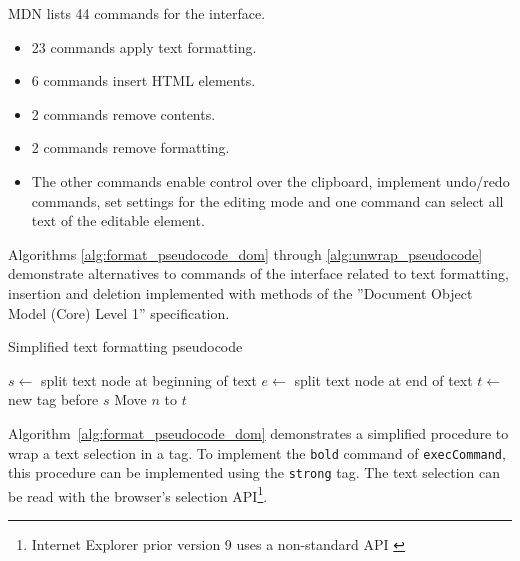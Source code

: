 MDN lists 44 commands for the  interface\cite{bc}. %

\begin{itemize}
\item 23 commands apply text formatting.
\item 6 commands insert HTML elements.
\item 2 commands remove contents.
\item 2 commands remove formatting.
\item The other commands enable control over the clipboard, implement undo/redo commands, set settings for the editing mode and one command can select all text of the editable element.
\end{itemize}

Algorithms \ref{alg:format_pseudocode_dom} through \ref{alg:unwrap_pseudocode} demonstrate alternatives to commands of the  interface related to text formatting, insertion and deletion implemented with methods of the ''Document Object Model (Core) Level 1'' specification.


\begin{algorithm}
\caption{Simplified text formatting pseudocode}
\label{alg:format_pseudocode_dom}
\begin{algorithmic}[1]
\State $s \gets$ split text node at beginning of text
\State $e \gets$ split text node at end of text
\State $t \gets$ new tag before $s$
  \State Move $n$ to $t$
\EndFor
\EndProcedure
\end{algorithmic}
\end{algorithm}



Algorithm~\ref{alg:format_pseudocode_dom} demonstrates a simplified procedure to wrap a text selection in a tag. To implement the \texttt{bold} command of \texttt{execCommand}, this procedure can be implemented using the \texttt{strong} tag. The text selection can be read with the browser's selection API\cite{az}\footnote{Internet Explorer prior version 9 uses a non-standard API \cite{a}}.

